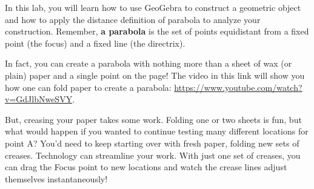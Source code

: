 
\noindent In this lab, you will learn how to use GeoGebra to construct a geometric object and how to apply the distance definition of parabola to analyze your construction. Remember, \textbf{a parabola} is the set of points equidistant from a fixed point (the focus) and a fixed line (the directrix). 
\vspace{0.2 in}

In fact, you can create a parabola with nothing more than a sheet of wax (or plain) paper and a single point on the page! The video in this link will show you how one can fold paper to create a parabola: \url{https://www.youtube.com/watch?v=GdJlbNweSVY}. 

\vspace{0.2 in}

But, creasing your paper takes some work. Folding one or two sheets is fun, but what would happen if you wanted to continue testing many different locations for point A? You’d need to keep starting over with fresh paper, folding new sets of creases. Technology can streamline your work. With just one set of creases, you can drag the Focus point to new locations and watch the crease lines adjust themselves instantaneously!



